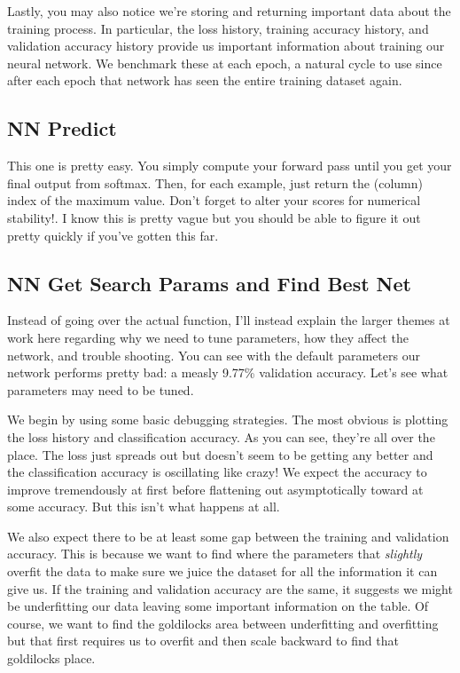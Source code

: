\documentclass[12pt]{article}
\begin{document}
Lastly, you may also notice we're storing and returning important data about the training process. In 
particular, the loss history, training accuracy history, and validation accuracy history provide us 
important information about training our neural network. We benchmark these at each epoch, a natural
cycle to use since after each epoch that network has seen the entire training dataset again. 

\subsection{NN Predict}
This one is pretty easy. You simply compute your forward pass until you get your final output from 
softmax. Then, for each example, just return the (column) index of the maximum value. Don't forget
to alter your scores for numerical stability!. I know this is pretty vague but you should be able 
to figure it out pretty quickly if you've gotten this far. 

\subsection{NN Get Search Params and Find Best Net}
Instead of going over the actual function, I'll instead explain the larger themes at work here regarding
why we need to tune parameters, how they affect the network, and trouble shooting. You can see with the 
default parameters our network performs pretty bad: a measly 9.77\% validation accuracy. Let's see what 
parameters may need to be tuned. 

We begin by using some basic debugging strategies. The most obvious is plotting the loss history and 
classification accuracy. As you can see, they're all over the place. The loss just spreads out but doesn't 
seem to be getting any better and the classification accuracy is oscillating like crazy! We expect the accuracy 
to improve tremendously at first before flattening out asymptotically toward at some accuracy. But this isn't 
what happens at all. 

We also expect there to be at least some gap between the training and validation accuracy. This is because
we want to find where the parameters that \emph{slightly} overfit the data to make sure we juice the dataset
for all the information it can give us. If the training and validation accuracy are the same, it suggests we might 
be underfitting our data leaving some important information on the table. Of course, we want to find the 
goldilocks area between underfitting and overfitting but that first requires us to overfit and then scale 
backward to find that goldilocks place. 
\end{document}
